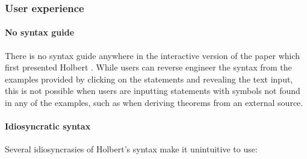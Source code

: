 \subsubsection{User experience}
\paragraph{No syntax guide}
There is no syntax guide anywhere in the interactive version of the paper which first presented Holbert \cite{oconnor:2022-interactive}. While users can reverse engineer the syntax from the examples provided by clicking on the statements and revealing the text input, this is not possible when users are inputting statements with symbols not found in any of the examples, such as when deriving theorems from an external source.

\paragraph{Idiosyncratic syntax}
Several idiosyncrasies of Holbert's syntax make it unintuitive to use:
